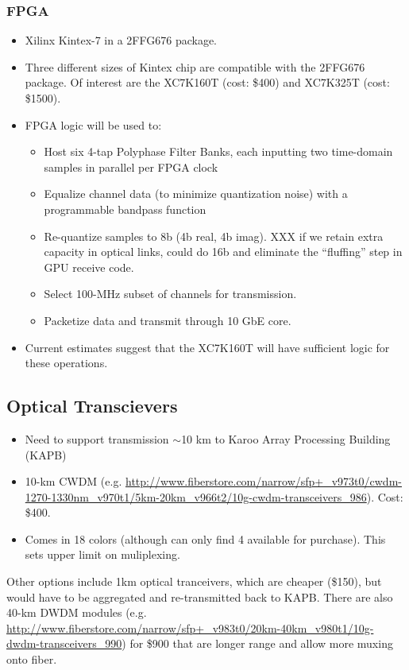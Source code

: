 \documentclass[11pt]{article}
\begin{document}
\subsubsection{FPGA}
\begin{itemize}
\item Xilinx Kintex-7 in a 2FFG676 package.  
\item Three different sizes of Kintex chip are compatible with the 2FFG676
package.  Of interest are the XC7K160T (cost: \$400) and XC7K325T (cost: \$1500).
\item FPGA logic will be used to:
\begin{itemize}
\item Host six 4-tap Polyphase Filter Banks, each inputting two
time-domain samples in parallel per FPGA clock
\item Equalize channel data (to minimize quantization noise) with a programmable bandpass function
\item Re-quantize samples to 8b (4b real, 4b imag). XXX if we retain extra capacity in optical links, could do 16b
and eliminate the ``fluffing'' step in GPU receive code.
\item Select 100-MHz subset of channels for transmission.
\item Packetize data and transmit through 10 GbE core.
\end{itemize}
\item Current estimates suggest that the XC7K160T will have sufficient logic for these operations.
\end{itemize}

\subsection{Optical Transcievers}
\begin{itemize}
\item Need to support transmission $\sim$10 km to Karoo Array Processing Building (KAPB)
\item 10-km CWDM (e.g. \url{http://www.fiberstore.com/narrow/sfp+_v973t0/cwdm-1270-1330nm_v970t1/5km-20km_v966t2/10g-cwdm-transceivers_986}). Cost: \$400.
\item Comes in 18 colors (although can only find 4 available for purchase).  This sets upper limit on muliplexing.
\end{itemize}

Other options include 1km optical tranceivers, which are cheaper (\$150), but would have to be aggregated and
re-transmitted back to KAPB.  There are also 40-km DWDM modules
(e.g. \url{http://www.fiberstore.com/narrow/sfp+_v983t0/20km-40km_v980t1/10g-dwdm-transceivers_990}) for
\$900 that are longer range and allow more muxing onto fiber.
\end{document}
